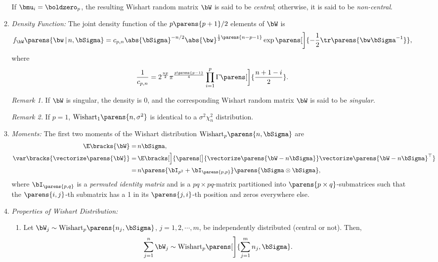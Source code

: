 \documentclass[12pt]{article}
\begin{document}
\begin{enumerate}[label=\textbf{\arabic*.}]
\begin{enumerate}
		If $\bmu_i = \boldzero_p$, the resulting Wishart random matrix $\bW$ is said to be \textit{central}; otherwise, it is said to be \textit{non-central}. 
		
		\item \textit{Density Function:} The joint density function of the $p \parens{p+1}/2$ elements of $\bW$ is 
		\begin{align*}
			f_{\bW} \parens{\bw \,\vert\, n, \bSigma} = c_{p, n} \abs{\bSigma}^{-n/2} \abs{\bw}^{\frac{1}{2}\parens{n-p-1}} \exp \parens[\bigg]{-\frac{1}{2} \tr \parens{\bw \bSigma^{-1}}}, 
		\end{align*}
		where 
		\begin{align*}
			\frac{1}{c_{p, n}} = 2^{\frac{np}{2}} \pi^{\frac{p \parens{p-1}}{4}} \prod_{i=1}^p \Gamma \parens[\bigg]{\frac{n+1-i}{2}}. 
		\end{align*}
		
		\textit{Remark 1.} If $\bW$ is singular, the density is 0, and the corresponding Wishart random matrix $\bW$ is said to be \textit{singular}. 
		
		\textit{Remark 2.} If $p = 1$, $\mathrm{Wishart}_1 \parens{n, \sigma^2}$ is identical to a $\sigma^2 \chi_n^2$ distribution. 
		
		\item \textit{Moments:} The first two moments of the Wishart distribution $\mathrm{Wishart}_p \parens{n, \bSigma}$ are 
		\begin{align*}
			\E \bracks{\bW} = & \, n \bSigma, \\ 
			\var \bracks{\vectorize \parens{\bW}} = & \, \E \bracks[\Big]{\parens[\big]{\vectorize \parens{\bW - n \bSigma}} \vectorize \parens{\bW - n \bSigma}^\top} \nonumber \\ 
			= & \, n \parens{\bI_{p^2} + \bI_{\parens{p, p}}} \parens{\bSigma \otimes \bSigma}, 
		\end{align*}
		where $\bI_{\parens{p, q}}$ is a \textit{permuted identity matrix} and is a $pq \times pq$-matrix partitioned into $\parens{p \times q}$-submatrices such that the $\parens{i, j}$-th submatrix has a 1 in its $\parens{j,i}$-th position and zeros everywhere else. 
		
		\item \textit{Properties of Wishart Distribution:}
		\begin{enumerate}
			\item Let $\bW_j \sim \mathrm{Wishart}_p \parens{n_j, \bSigma}$, $j = 1, 2, \cdots, m$, be independently distributed (central or not). Then, 
			\begin{align*}
				\sum_{j=1}^n \bW_j \sim \mathrm{Wishart}_p \parens[\Bigg]{\sum_{j=1}^m n_j, \bSigma}. 
			\end{align*}
			

\end{enumerate}
\end{enumerate}
\end{enumerate}
\end{document}
